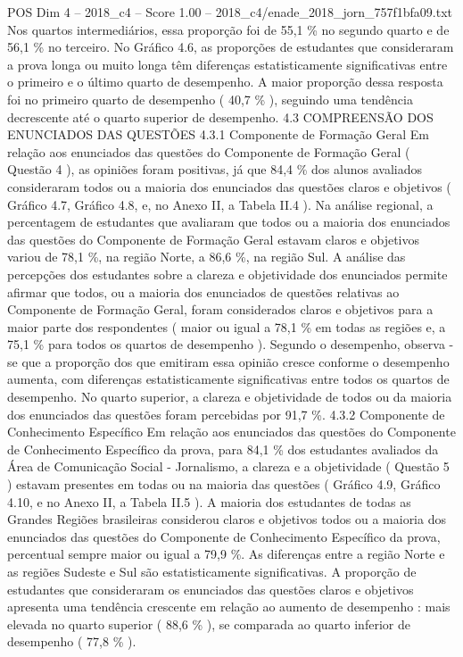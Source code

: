 \begin{textsample}{POS Dim 4 – 2018\_c4 – Score 1.00 – 2018\_c4/enade\_2018\_jorn\_757f1bfa09.txt}
Nos quartos intermediários, essa proporção foi de 55,1 \% no segundo quarto e de 56,1 \% no terceiro.
No Gráfico 4.6, as proporções de estudantes que consideraram a prova longa ou muito longa têm diferenças estatisticamente significativas entre o primeiro e o último quarto de desempenho.
A maior proporção dessa resposta foi no primeiro quarto de desempenho ( 40,7 \% ), seguindo uma tendência decrescente até o quarto superior de desempenho. 4.3 COMPREENSÃO DOS ENUNCIADOS DAS QUESTÕES 4.3.1 Componente de Formação Geral Em relação aos enunciados das questões do Componente de Formação Geral ( Questão 4 ), as opiniões foram positivas, já que 84,4 \% dos alunos avaliados consideraram todos ou a maioria dos enunciados das questões claros e objetivos ( Gráfico 4.7, Gráfico 4.8, e, no Anexo II, a Tabela II.4 ).
Na análise regional, a percentagem de estudantes que avaliaram que todos ou a maioria dos enunciados das questões do Componente de Formação Geral estavam claros e objetivos variou de 78,1 \%, na região Norte, a 86,6 \%, na região Sul.
A análise das percepções dos estudantes sobre a clareza e objetividade dos enunciados permite afirmar que todos, ou a maioria dos enunciados de questões relativas ao Componente de Formação Geral, foram considerados claros e objetivos para a maior parte dos respondentes ( maior ou igual a 78,1 \% em todas as regiões e, a 75,1 \% para todos os quartos de desempenho ).
Segundo o desempenho, observa -se que a proporção dos que emitiram essa opinião cresce conforme o desempenho aumenta, com diferenças estatisticamente significativas entre todos os quartos de desempenho.
No quarto superior, a clareza e objetividade de todos ou da maioria dos enunciados das questões foram percebidas por 91,7 \%. 4.3.2 Componente de Conhecimento Específico Em relação aos enunciados das questões do Componente de Conhecimento Específico da prova, para 84,1 \% dos estudantes avaliados da Área de Comunicação Social - Jornalismo, a clareza e a objetividade ( Questão 5 ) estavam presentes em todas ou na maioria das questões ( Gráfico 4.9, Gráfico 4.10, e no Anexo II, a Tabela II.5 ).
A maioria dos estudantes de todas as Grandes Regiões brasileiras considerou claros e objetivos todos ou a maioria dos enunciados das questões do Componente de Conhecimento Específico da prova, percentual sempre maior ou igual a 79,9 \%.
As diferenças entre a região Norte e as regiões Sudeste e Sul são estatisticamente significativas.
A proporção de estudantes que consideraram os enunciados das questões claros e objetivos apresenta uma tendência crescente em relação ao aumento de desempenho : mais elevada no quarto superior ( 88,6 \% ), se comparada ao quarto inferior de desempenho ( 77,8 \% ).

\end{textsample}
